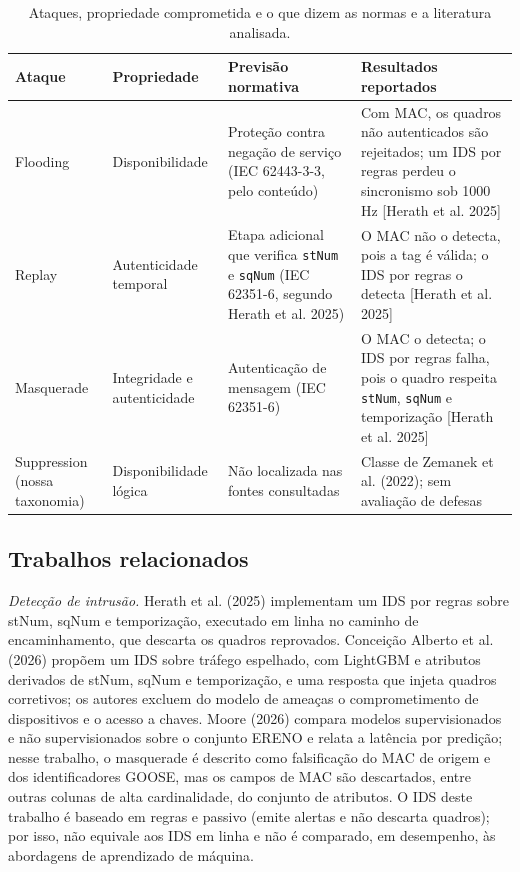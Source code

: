 \documentclass[12pt]{article}
\newcommand{\cit}[2]{[#1]\nocite{#2}}
\newcommand{\citn}[2]{#1\nocite{#2}}
\begin{document}
\begin{table}[!t]
\centering
\caption{Ataques, propriedade comprometida e o que dizem as normas e a literatura analisada.}\label{tab:1}
\footnotesize
\renewcommand{\arraystretch}{1.25}
\begin{tabularx}{\linewidth}{|>{\hsize=0.644\hsize\raggedright\arraybackslash}X|>{\hsize=0.868\hsize\raggedright\arraybackslash}X|>{\hsize=1.244\hsize\raggedright\arraybackslash}X|>{\hsize=1.244\hsize\raggedright\arraybackslash}X|}
\hline
\textbf{Ataque} & \textbf{Propriedade} & \textbf{Previsão normativa} & \textbf{Resultados reportados} \\ \hline
Flooding & Disponibilidade & Proteção contra negação de serviço (IEC 62443-3-3, pelo conteúdo) & Com MAC, os quadros não autenticados são rejeitados; um IDS por regras perdeu o sincronismo sob 1000 Hz \cit{Herath et al. 2025}{herath2025evaluation} \\ \hline
Replay & Autenticidade temporal & Etapa adicional que verifica \texttt{stNum} e \texttt{sqNum} (IEC 62351-6, segundo Herath et al. 2025) & O MAC não o detecta, pois a tag é válida; o IDS por regras o detecta \cit{Herath et al. 2025}{herath2025evaluation} \\ \hline
Masquerade & Integridade e autenticidade & Autenticação de mensagem (IEC 62351-6) & O MAC o detecta; o IDS por regras falha, pois o quadro respeita \texttt{stNum}, \texttt{sqNum} e temporização \cit{Herath et al. 2025}{herath2025evaluation} \\ \hline
Suppression (nossa taxonomia) & Disponibilidade lógica & Não localizada nas fontes consultadas & Classe de \citn{Zemanek et al. (2022)}{zemanek2022powerduck}; sem avaliação de defesas \\ \hline
\end{tabularx}
\end{table}

\subsection{Trabalhos relacionados}\label{sec:2.3}

\emph{Detecção de intrusão.} \citn{Herath et al. (2025)}{herath2025evaluation} implementam um IDS por regras sobre stNum, sqNum e temporização, executado em linha no caminho de encaminhamento, que descarta os quadros reprovados. \citn{Conceição Alberto et al. (2026)}{alberto2026gooseidrs} propõem um IDS sobre tráfego espelhado, com LightGBM e atributos derivados de stNum, sqNum e temporização, e uma resposta que injeta quadros corretivos; os autores excluem do modelo de ameaças o comprometimento de dispositivos e o acesso a chaves. \citn{Moore (2026)}{moore2026anomaly} compara modelos supervisionados e não supervisionados sobre o conjunto ERENO e relata a latência por predição; nesse trabalho, o masquerade é descrito como falsificação do MAC de origem e dos identificadores GOOSE, mas os campos de MAC são descartados, entre outras colunas de alta cardinalidade, do conjunto de atributos. O IDS deste trabalho é baseado em regras e passivo (emite alertas e não descarta quadros); por isso, não equivale aos IDS em linha e não é comparado, em desempenho, às abordagens de aprendizado de máquina.
\end{document}
